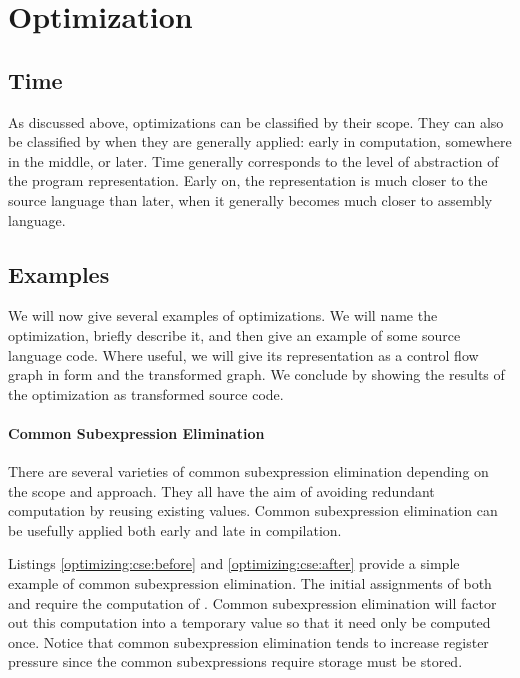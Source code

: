 \section{Optimization}
\subsection{Time}
As discussed above, optimizations can be classified by their scope. They can also be classified by when they are generally applied: early in computation, somewhere in the middle, or later. Time generally corresponds to the level of abstraction of the program representation. Early on, the representation is much closer to the source language than later, when it generally becomes much closer to assembly language.

\subsection{Examples}
We will now give several examples of optimizations. We will name the optimization, briefly describe it, and then give an example of some source language code. Where useful, we will give its representation as a control flow graph in \SSA form and the transformed graph. We conclude by showing the results of the optimization as transformed source code.
\paragraph{Common Subexpression Elimination}
There are several varieties of common subexpression elimination depending on the scope and approach. They all have the aim of avoiding redundant computation by reusing existing values. Common subexpression elimination can be usefully applied both early and late in compilation.

Listings \ref{optimizing:cse:before} and \ref{optimizing:cse:after} provide a simple example of common subexpression elimination. The initial assignments of both  and  require the computation of . Common subexpression elimination will factor out this computation into a temporary value so that it need only be computed once. Notice that common subexpression elimination tends to increase register pressure since the common subexpressions require storage must be stored.



